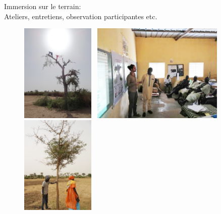 \documentclass[aspectratio=169]{beamer}
\begin{document}
\begin{frame}{Immersion sur le terrain: \\
    Ateliers, entretiens, observation participantes etc.}
    \begin{center}
        \vspace{-1em}
        \begin{figure}
            \centering
            \includegraphics[height = 4.7cm]{img/emondage_faidherbia.png}~
            \includegraphics[height = 4.7cm]{img/atelierLucas.jpg}~
            \includegraphics[height = 4.7cm]{img/entretienChamp.jpg}
        \end{figure}
    \end{center}
\end{frame}
\end{document}
